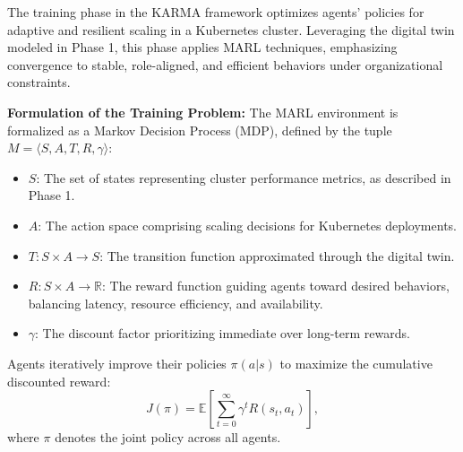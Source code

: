 \documentclass[conference]{IEEEtran}
\begin{document}

The training phase in the KARMA framework optimizes agents’ policies for adaptive and resilient scaling in a Kubernetes cluster. Leveraging the digital twin modeled in Phase 1, this phase applies MARL techniques, emphasizing convergence to stable, role-aligned, and efficient behaviors under organizational constraints.

\noindent\textbf{Formulation of the Training Problem:} 
The MARL environment is formalized as a Markov Decision Process (MDP), defined by the tuple $M = \langle S, A, T, R, \gamma \rangle$:
\begin{itemize}
    \item $S$: The set of states representing cluster performance metrics, as described in Phase 1.
    \item $A$: The action space comprising scaling decisions for Kubernetes deployments.
    \item $T: S \times A \rightarrow S$: The transition function approximated through the digital twin.
    \item $R: S \times A \rightarrow \mathbb{R}$: The reward function guiding agents toward desired behaviors, balancing latency, resource efficiency, and availability.
    \item $\gamma$: The discount factor prioritizing immediate over long-term rewards.
\end{itemize}
Agents iteratively improve their policies $\pi(a|s)$ to maximize the cumulative discounted reward:
\[
J(\pi) = \mathbb{E} \left[ \sum_{t=0}^{\infty} \gamma^t R(s_t, a_t) \right],
\]
where $\pi$ denotes the joint policy across all agents.
\end{document}
